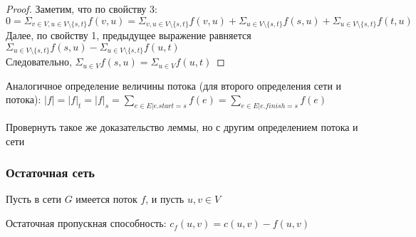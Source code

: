 \begin{proof}
    Заметим, что по свойству 3: $0 = \Sigma_{v \in V, u \in V \setminus \{s, t\}} f(v, u) = \Sigma_{v, u \in V \setminus \{s, t\}} f(v, u) + \Sigma_{u \in V \setminus \{s, t\}} f(s, u) + \Sigma_{u \in V \setminus \{s, t\}} f(t, u)$ \\
    Далее, по свойству 1, предыдущее выражение равняется $\Sigma_{u \in V \setminus \{s, t\}} f(s, u) - \Sigma_{u \in V \setminus \{s, t\}} f(u, t)$ \\
    Следовательно, $\Sigma_{u \in V} f(s, u) = \Sigma_{u \in V} f(u, t)$
\end{proof}

\begin{definition}
    Аналогичное определение величины потока (для второго определения сети и потока): $|f| = |f|_t = |f|_s = \sum_{e \in E | e.start = s} f(e) = \sum_{e \in E | e.finish = s} f(e)$
\end{definition}

\begin{exercise}
    Провернуть такое же доказательство леммы, но с другим определением потока и сети
\end{exercise}

\subsubsection{Остаточная сеть}

\noindent Пусть в сети $G$ имеется поток $f$, и пусть $u, v \in V$
\begin{definition}
    Остаточная пропускная способность: $c_f(u, v) = c(u, v) - f(u, v)$
\end{definition}

